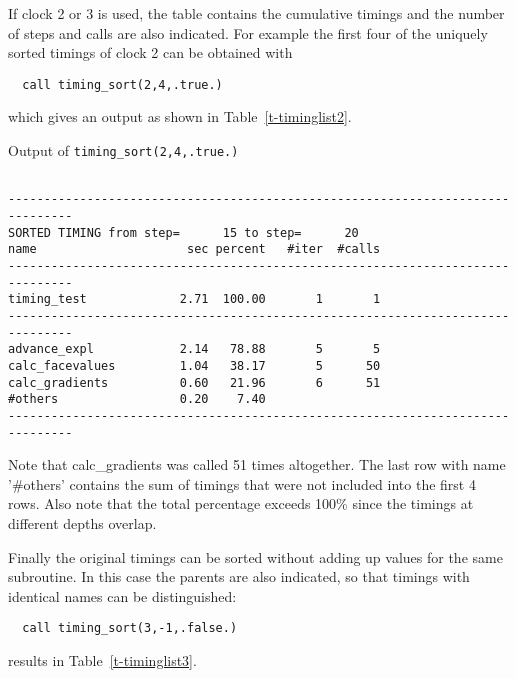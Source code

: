 If clock 2 or 3 is used, the table contains the cumulative timings 
and the number of steps and calls are also indicated. 
For example the first four of the uniquely sorted timings of clock 2 
can be obtained with
\begin{verbatim}
  call timing_sort(2,4,.true.)
\end{verbatim}
which gives an output as shown in Table~\ref{t-timinglist2}.
\begin{table}
\caption{Output of {\tt timing\_sort(2,4,.true.)}}

{\footnotesize
\begin{verbatim}

-------------------------------------------------------------------------------
SORTED TIMING from step=      15 to step=      20
name                     sec percent   #iter  #calls
-------------------------------------------------------------------------------
timing_test             2.71  100.00       1       1
-------------------------------------------------------------------------------
advance_expl            2.14   78.88       5       5
calc_facevalues         1.04   38.17       5      50
calc_gradients          0.60   21.96       6      51
#others                 0.20    7.40
-------------------------------------------------------------------------------

\end{verbatim}
}
\label{t-timinglist2}
\end{table}
Note that calc\_gradients was called 51 times altogether. The last row
with name '\#others' contains the sum of timings that were not included
into the first 4 rows. Also note that the total percentage exceeds 
100\% since the timings at different depths overlap.

Finally the original timings can be sorted without adding up values
for the same subroutine. In this case the parents are also indicated,
so that timings with identical names can be distinguished:
\begin{verbatim}
  call timing_sort(3,-1,.false.)
\end{verbatim}
results in Table~\ref{t-timinglist3}.

